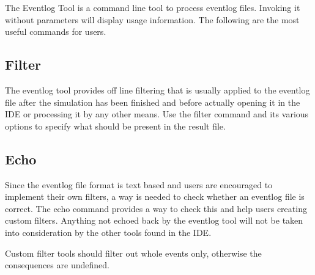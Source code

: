 The Eventlog Tool is a command line tool to process eventlog files. Invoking it without
parameters will display usage information. The following are the most useful commands for users.

\subsection{Filter}

The eventlog tool provides off line filtering that is usually applied to the eventlog file
after the simulation has been finished and before actually opening it in the {\opp} IDE
or processing it by any other means. Use the filter command and its various options to
specify what should be present in the result file.

\subsection{Echo}

Since the eventlog file format is text based and users are encouraged to implement their
own filters, a way is needed to check whether an eventlog file is
correct. The echo command provides a way to check this and help users creating custom
filters. Anything not echoed back by the eventlog tool will not be taken into
consideration by the other tools found in the {\opp} IDE.

\begin{note}
    Custom filter tools should filter out whole events only, otherwise the
    consequences are undefined.
\end{note}

